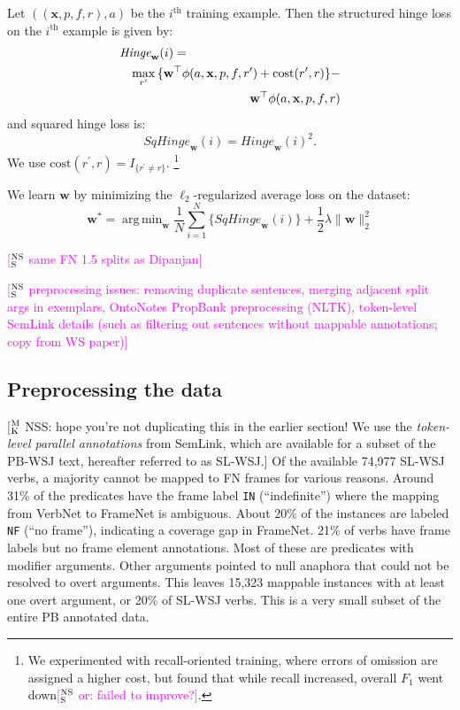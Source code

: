 \documentclass[11pt,a4paper]{article}
\newcommand{\indicator}[1]{I_{\{#1\}}} %
\DeclareMathOperator*{\argmin}{arg\,min}
\newcommand{\ensuretext}[1]{#1}
\newcommand{\nssmarker}{\ensuretext{\textcolor{magenta}{\ensuremath{^{\textsc{NS}}_{\textsc{S}}}}}}
\newcommand{\mkmarker}{\ensuretext{\textcolor{mdgreen}{\ensuremath{^{\textsc{M}}_{\textsc{K}}}}}}
\newcommand{\arkcomment}[3]{\ensuretext{\textcolor{#3}{[#1 #2]}}}
\newcommand{\nss}[1]{\arkcomment{\nssmarker}{#1}{magenta}}
\newcommand{\mk}[1]{\arkcomment{\mkmarker}{#1}{mdgreen}}
\begin{document}
Let $((\mathbf{x}, p, f, r), a)$ %
be the $i^{\text{th}}$ training example.
Then the structured hinge loss on the $i^{\text{th}}$ example is given by:
\begin{align*}
\lefteqn{\textit{Hinge}_\mathbf{w}(i) =} \\
&&\max_{r^\prime}{\{\mathbf{w}^\top \mathbf{\phi}(a, \mathbf{x}, p, f, r^\prime) + \text{cost}(r^\prime, r)\}} - \\
&&\mathbf{w}^\top \mathbf{\phi}(a, \mathbf{x}, p, f, r)
\end{align*}
and squared hinge loss is:
\begin{equation}
\textit{SqHinge}_\mathbf{w}(i) =
\textit{Hinge}_\mathbf{w}(i)^2.
\end{equation}
We use $\text{cost}(r^\prime, r) = \indicator{r^\prime \ne r}$.%
\footnote{We experimented with recall-oriented training, where errors of omission are assigned a higher cost, but found that while recall increased, overall $F_1$ went down\nss{or: failed to improve?}.}

We learn $\mathbf{w}$ by minimizing the $\ell_2$-regularized average loss on the dataset:
\begin{equation}
\mathbf{w^*} = \argmin_\mathbf{w}{
    \frac{1}{N}\sum_{i = 1}^N\{
        \textit{SqHinge}_\mathbf{w}(i)
    \} + \frac{1}{2} \lambda \| \mathbf{w} \|_2^2
}
\end{equation}


\nss{same FN 1.5 splits as Dipanjan}


\nss{preprocessing issues: removing duplicate sentences, merging adjacent split args in exemplars, OntoNotes PropBank preprocessing (NLTK), token-level SemLink details (such as filtering out sentences without mappable annotations; copy from WS paper)}

\subsection{Preprocessing the data}


\mk{NSS: hope you're not duplicating this in the earlier section! 
We use the \emph{token-level parallel annotations} from SemLink, which are available for a subset of the PB-WSJ text, 
hereafter referred to as SL-WSJ.} Of the available 74,977 SL-WSJ verbs, a majority cannot be mapped to FN frames for various reasons.
Around 31\% of the predicates have the frame label \texttt{IN} (``indefinite'') where the mapping from VerbNet to FrameNet is ambiguous.
About 20\% of the instances are labeled \texttt{NF} (``no frame''), indicating a coverage gap in FrameNet. 
21\% of verbs have frame labels but no frame element annotations. Most of these are predicates with modifier arguments.
Other arguments pointed to null anaphora that could not be resolved to overt arguments.
This leaves 15,323 mappable instances with at least one overt argument, or 20\% of SL-WSJ verbs. This is a very small
subset of the entire PB annotated data.
\end{document}
